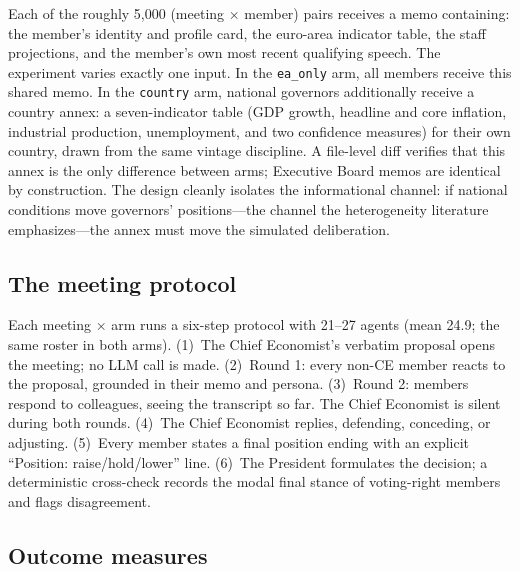 \documentclass[11pt,a4paper]{article}
\begin{document}
Each of the roughly 5,000 (meeting $\times$ member) pairs receives a memo containing: the member's identity and profile card, the euro-area indicator table, the staff projections, and the member's own most recent qualifying speech. The experiment varies exactly one input. In the \texttt{ea\_only} arm, all members receive this shared memo. In the \texttt{country} arm, national governors additionally receive a country annex: a seven-indicator table (GDP growth, headline and core inflation, industrial production, unemployment, and two confidence measures) for their own country, drawn from the same vintage discipline. A file-level diff verifies that this annex is the only difference between arms; Executive Board memos are identical by construction. The design cleanly isolates the informational channel: if national conditions move governors' positions---the channel the heterogeneity literature emphasizes---the annex must move the simulated deliberation.

\subsection{The meeting protocol}\label{sec:protocol}

Each meeting $\times$ arm runs a six-step protocol with 21--27 agents (mean 24.9; the same roster in both arms). (1)~The Chief Economist's verbatim proposal opens the meeting; no LLM call is made. (2)~Round 1: every non-CE member reacts to the proposal, grounded in their memo and persona. (3)~Round 2: members respond to colleagues, seeing the transcript so far. The Chief Economist is silent during both rounds. (4)~The Chief Economist replies, defending, conceding, or adjusting. (5)~Every member states a final position ending with an explicit ``Position: raise/hold/lower'' line. (6)~The President formulates the decision; a deterministic cross-check records the modal final stance of voting-right members and flags disagreement.

\subsection{Outcome measures}\label{sec:outcomes}
\end{document}
